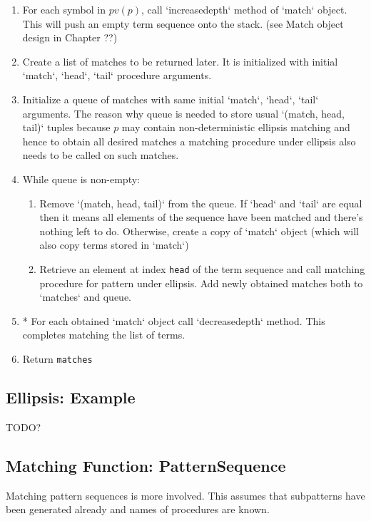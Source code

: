 \begin{enumerate}
\item
For each symbol in $pv(p)$, call `increasedepth` method of `match` object. This will push an empty term sequence onto the stack. (see Match object design in Chapter ??)
\item
Create a list of matches to be returned later. It is initialized with initial `match`, `head`, `tail` procedure arguments.
\item
Initialize a queue of matches with same initial `match`, `head`, `tail` arguments. The reason why queue is needed to store usual `(match, head, tail)` tuples because $p$ may contain non-deterministic ellipsis matching and hence to obtain all desired matches a matching procedure under ellipsis also needs to be called on such matches.
\item While queue is non-empty:
	\begin{enumerate}
	\item 
	Remove `(match, head, tail)` from the queue. If `head` and `tail` are equal then it means all elements of the sequence have been matched and there's nothing left to do.  Otherwise, create a copy of `match` object (which will also copy terms stored in `match`)
	\item
	Retrieve an element at index \texttt{head} of the term sequence and call matching procedure for pattern under ellipsis. Add newly obtained matches both to `matches` and queue.
	\end{enumerate}

\item
* For each obtained `match` object call `decreasedepth` method. This completes matching the list of terms.
\item
Return \texttt{matches}
\end{enumerate}


\subsection{Ellipsis: Example}
TODO?


\subsection{Matching Function: PatternSequence}

Matching pattern sequences is more involved. This assumes that subpatterns have been generated already and names of procedures are known. 

